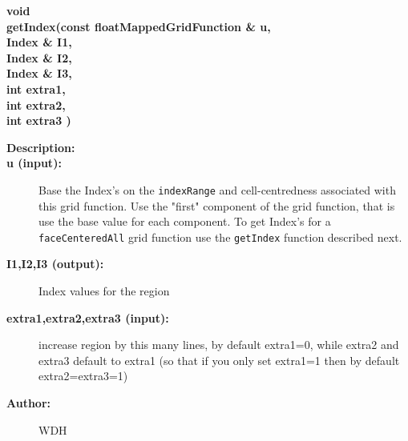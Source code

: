 \begin{flushleft} \textbf{%
void  \\ 
\settowidth{\OGgetIndexIncludeArgIndent}{getIndex(}%
getIndex(const floatMappedGridFunction \& u, \\ 
\hspace{\OGgetIndexIncludeArgIndent}Index \& I1, \\ 
\hspace{\OGgetIndexIncludeArgIndent}Index \& I2, \\ 
\hspace{\OGgetIndexIncludeArgIndent}Index \& I3,\\ 
\hspace{\OGgetIndexIncludeArgIndent}int extra1,\\ 
\hspace{\OGgetIndexIncludeArgIndent}int extra2,\\ 
\hspace{\OGgetIndexIncludeArgIndent}int extra3 )
}\end{flushleft}
\begin{description}
\item[{\bf Description:}] 
\item[{\bf u (input):}]  Base the Index's on the {\tt indexRange} and cell-centredness associated   
     with this grid function. Use the "first" component of the grid function, that is
     use the base value for each component. To get Index's for a {\tt faceCenteredAll} grid function
     use the {\tt getIndex} function described next.
\item[{\bf I1,I2,I3 (output):}]  Index values for the region
\item[{\bf extra1,extra2,extra3 (input):}]  increase region by this many lines, by default extra1=0, while 
                         extra2 and extra3 default to extra1 (so that if you only set extra1=1
                         then by default extra2=extra3=1)
\item[{\bf Author:}]  WDH
\end{description}


